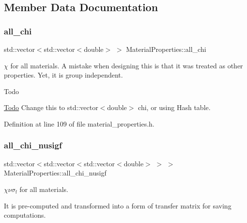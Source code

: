 \subsection{Member Data Documentation}
\mbox{\label{class_material_properties_afb25f14545f97c91dacfffcae9d0dcf3}} 
\subsubsection{\texorpdfstring{all\+\_\+chi}{all\_chi}}
{\footnotesize\ttfamily std\+::vector$<$std\+::vector$<$double$>$ $>$ Material\+Properties\+::all\+\_\+chi\hspace{0.3cm}{\ttfamily [private]}}

$\chi$ for all materials. A mistake when designing this is that it was treated as other properties. Yet, it is group independent.

\begin{DoxyRefDesc}{Todo}
\item[\hyperlink{todo__todo000008}{Todo}]Change this to std\+::vector$<$double$>$ chi, or using Hash table. \end{DoxyRefDesc}


Definition at line 109 of file material\+\_\+properties.\+h.

\mbox{\label{class_material_properties_a77cac1147aa82a264d5d7f8782c6bd26}} 
\subsubsection{\texorpdfstring{all\+\_\+chi\+\_\+nusigf}{all\_chi\_nusigf}}
{\footnotesize\ttfamily std\+::vector$<$std\+::vector$<$std\+::vector$<$double$>$ $>$ $>$ Material\+Properties\+::all\+\_\+chi\+\_\+nusigf\hspace{0.3cm}{\ttfamily [private]}}



$\chi\nu\sigma_\mathrm{f}$ for all materials. 

It is pre-\/computed and transformed into a form of transfer matrix for saving computations. 

